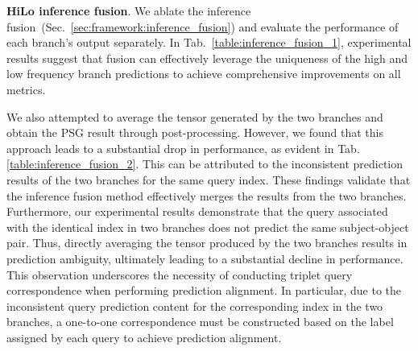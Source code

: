 \noindent \textbf{HiLo inference fusion}.
We ablate the inference fusion~(Sec.~\ref{sec:framework:inference_fusion}) and evaluate the performance of each branch's output separately.
In Tab.~\ref{table:inference_fusion_1}, experimental results suggest that fusion can effectively leverage the uniqueness of the high and low frequency branch predictions to achieve comprehensive improvements on all metrics.

We also attempted to average the tensor generated by the two branches and obtain the PSG result through post-processing.
However, we found that this approach leads to a substantial drop in performance, as evident in Tab. \ref{table:inference_fusion_2}.
This can be attributed to the inconsistent prediction results of the two branches for the same query index.
These findings validate that the inference fusion method effectively merges the results from the two branches.
Furthermore, our experimental results demonstrate that the query associated with the identical index in two branches does not predict the same subject-object pair.
Thus, directly averaging the tensor produced by the two branches results in prediction ambiguity, ultimately leading to a substantial decline in performance.
This observation underscores the necessity of conducting triplet query correspondence when performing prediction alignment.
In particular, due to the inconsistent query prediction content for the corresponding index in the two branches, a one-to-one correspondence must be constructed based on the label assigned by each query to achieve prediction alignment.

\begin{table}\small
    \centering
    \vspace{+1mm}
    \caption{Ablation study for HiLo inference fusion.}
    \vspace{-4mm}
    \label{table:inference_fusion_1}
\end{table}


